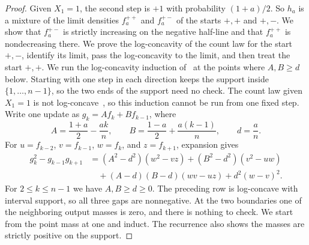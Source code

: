 \begin{proof}
Given $X_1=1$, the second step is $+1$ with probability $(1+a)/2$. So
$h_a$ is a mixture of the limit densities $f_a^{++}$ and $f_a^{+-}$ of
the starts $+,+$ and $+,-$. We show that $f_a^{+-}$ is strictly
increasing on the negative half-line and that $f_a^{++}$ is
nondecreasing there. We prove the log-concavity of the count law for the
start $+,-$, identify its limit, pass the log-concavity to the limit,
and then treat the start $+,+$.
We run the log-concavity induction of~\cite[Proposition~2.2]{glrs2025} at
the points where $A,B\ge d$ below. Starting
with one step in each direction keeps the support inside
$\{1,\ldots,n-1\}$, so the two ends of the support need no check. The count law given $X_1=1$ is not
log-concave~\cite{tv2026}, so this induction cannot be run from one
fixed step.
Write one update as
$g_k=Af_k+Bf_{k-1}$, where
\[
 A=\frac{1+a}{2}-\frac{ak}{n},\qquad
 B=\frac{1-a}{2}+\frac{a(k-1)}n,\qquad d=\frac an.
\]
For $u=f_{k-2}$, $v=f_{k-1}$, $w=f_k$, and $z=f_{k+1}$, expansion gives
\begin{align*}
 g_k^2-g_{k-1}g_{k+1}
 &=(A^2-d^2)(w^2-vz)+(B^2-d^2)(v^2-uw)\\
 &\quad +(A-d)(B-d)(wv-uz)+d^2(w-v)^2.
\end{align*}
For $2\le k\le n-1$ we have $A,B\ge d\ge0$.
The preceding row is log-concave with interval support, so all
three gaps are nonnegative. At the two boundaries one of the
neighboring output masses is zero, and there is nothing to check. We
start from the point mass at one and induct. The recurrence also
shows the masses are strictly positive on the support.


\end{proof}

